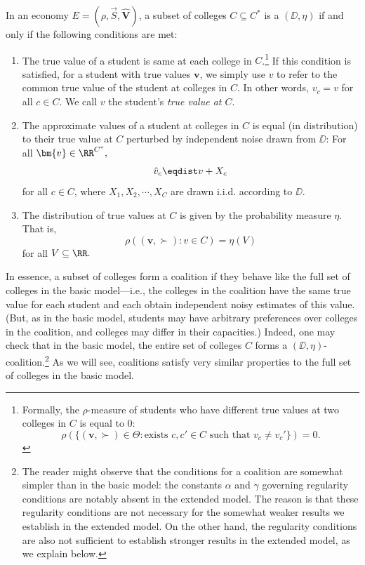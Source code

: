\documentclass[10pt]{article}
\begin{document}
\begin{ReviewVerbatim}
In an economy $E=(\rho, \vec{S}, \hat{\bm{V}})$, a subset of colleges $C\subseteq {C^*}$ is a $(\DD,\eta)$ if and only if the following conditions are met:
\begin{enumerate}
    \item The true value of a student is same at each college in $C$.\footnote{Formally, the $\rho$-measure of students who have different true values at two colleges in $C$ is equal to $0$:
    \begin{equation}
        \rho\left(\{(\bm{v}, \succ) \in \Theta: \text{exists }c,c'\in C\text{ such that }v_c\neq v_c'\}\right) = 0.
    \end{equation}
    }
    If this condition is satisfied, for a student with true values $\bm{v}$, we simply use $v$ to refer to the common true value of the student at colleges in $C$. In other words, $v_c=v$ for all $c\in C$. We call $v$ the student's \textit{true value at $C$}.
    \item The approximate values of a student at colleges in $C$ is equal (in distribution) to their true value at $C$ perturbed by independent noise drawn from $\DD$: For all $\bm{v}\in \RR^{C^*},$
    \begin{equation}
        \hat{v}_c \eqdist v + X_c
    \end{equation}
    for all $c\in C$,
    where $X_1, X_2, \cdots, X_C$ are drawn i.i.d. according to $\DD$.
    \item The distribution of true values at $C$ is given by the probability measure $\eta$. That is,
    \begin{equation}
        \rho((\bm{v},\succ): v\in C) = \eta(V)
    \end{equation}
    for all $V\subseteq \RR.$
\end{enumerate}

In essence, a subset of colleges form a coalition if they behave like the full set of colleges in the basic model---i.e., the colleges in the coalition have the same true value for each student and each obtain independent noisy estimates of this value. (But, as in the basic model, students may have arbitrary preferences over colleges in the coalition, and colleges may differ in their capacities.) Indeed, one may check that in the basic model, the entire set of colleges $C$ forms a $(\DD,\eta)$-coalition.\footnote{The reader might observe that the conditions for a coalition are somewhat simpler than in the basic model: the constants $\alpha$ and $\gamma$ governing regularity conditions are notably absent in the extended model. The reason is that these regularity conditions are not necessary for the somewhat weaker results we establish in the extended model. On the other hand, the regularity conditions are also not sufficient to establish stronger results in the extended model, as we explain below.} As we will see, coalitions satisfy very similar properties to the full set of colleges in the basic model.


\end{ReviewVerbatim}
\end{document}
